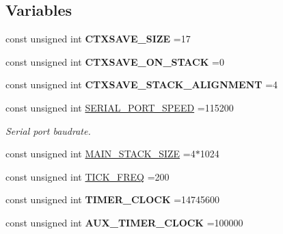 \subsection*{Variables}
\begin{DoxyCompactItemize}
\item 
\hypertarget{group___settings_ga578154732b64fcf2588d6e9aa8d1c8b5}{const unsigned int {\bfseries C\-T\-X\-S\-A\-V\-E\-\_\-\-S\-I\-Z\-E} =17}\label{group___settings_ga578154732b64fcf2588d6e9aa8d1c8b5}

\item 
\hypertarget{group___settings_gadf6c1cc7c4a9b8ea984e92d2c8945a0e}{const unsigned int {\bfseries C\-T\-X\-S\-A\-V\-E\-\_\-\-O\-N\-\_\-\-S\-T\-A\-C\-K} =0}\label{group___settings_gadf6c1cc7c4a9b8ea984e92d2c8945a0e}

\item 
\hypertarget{group___settings_ga747d601c83f772bf30683b0feb947d49}{const unsigned int {\bfseries C\-T\-X\-S\-A\-V\-E\-\_\-\-S\-T\-A\-C\-K\-\_\-\-A\-L\-I\-G\-N\-M\-E\-N\-T} =4}\label{group___settings_ga747d601c83f772bf30683b0feb947d49}

\item 
\hypertarget{group___settings_ga20c40084a620833b1c2e21d3456d35e1}{const unsigned int \hyperlink{group___settings_ga20c40084a620833b1c2e21d3456d35e1}{S\-E\-R\-I\-A\-L\-\_\-\-P\-O\-R\-T\-\_\-\-S\-P\-E\-E\-D} =115200}\label{group___settings_ga20c40084a620833b1c2e21d3456d35e1}

\begin{DoxyCompactList}\small\item\em Serial port baudrate. \end{DoxyCompactList}\item 
const unsigned int \hyperlink{group___settings_ga78af1ac6f48bb21cdd8a6e51b26899a3}{M\-A\-I\-N\-\_\-\-S\-T\-A\-C\-K\-\_\-\-S\-I\-Z\-E} =4$\ast$1024
\item 
const unsigned int \hyperlink{group___settings_ga81e4cfce99dd185b6ada00ead4f39342}{T\-I\-C\-K\-\_\-\-F\-R\-E\-Q} =200
\item 
\hypertarget{group___settings_ga7168af7781e3dc7cee2a9362c6f75609}{const unsigned int {\bfseries T\-I\-M\-E\-R\-\_\-\-C\-L\-O\-C\-K} =14745600}\label{group___settings_ga7168af7781e3dc7cee2a9362c6f75609}

\item 
\hypertarget{group___settings_gaa28b40afbb96fb90673e83c2b9ac6105}{const unsigned int {\bfseries A\-U\-X\-\_\-\-T\-I\-M\-E\-R\-\_\-\-C\-L\-O\-C\-K} =100000}\label{group___settings_gaa28b40afbb96fb90673e83c2b9ac6105}


\end{DoxyCompactItemize}
